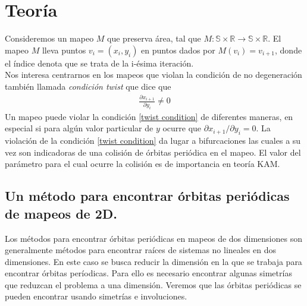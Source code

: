 
\chapter{Teor\'ia}
Consideremos un mapeo $M$ que preserva \'area, tal que $M:\mathbb{S} \times \mathbb{R} \longrightarrow \mathbb{S}\times\mathbb{R}$. El mapeo $M$ lleva puntos $v_{i}= (x_{i},y_{i})$ en puntos dados por $M(v_{i})=v_{i+1}$, donde el \'indice denota que se trata de la i-\'esima iteraci\'on. \\

Nos interesa centrarnos en los mapeos que violan la condici\'on de no degeneraci\'on tambi\'en llamada \textit{condici\'on twist} que dice que 
\begin{eqnarray}
\frac{\partial x_{i+1}}{\partial y_{i}} \neq 0
\label{twist condition}
\end{eqnarray}
Un mapeo puede violar la condici\'on \ref{twist condition} de diferentes maneras, en especial si para alg\'un valor particular de $y$ ocurre que $\partial x_{i+1}/\partial y_{i} = 0$. La violaci\'on de la condici\'on \ref{twist condition} da lugar a bifurcaciones las cuales a su vez son indicadoras de una colisi\'on de \'orbitas peri\'odica en el mapeo. El valor del par\'ametro para el cual ocurre la colisi\'on es de importancia en teor\'ia KAM. 

\section{Un m\'etodo para encontrar \'orbitas peri\'odicas de mapeos de 2D.}

Los m\'etodos para encontrar \'orbitas peri\'odicas en mapeos de dos dimensiones son generalmente m\'etodos para encontrar ra\'ices de sistemas no lineales en dos dimensiones. En este caso se busca reducir la dimensi\'on en la que se trabaja para encontrar \'orbitas per\'iodicas. Para ello es necesario encontrar algunas simetr\'ias que reduzcan el problema a una dimensi\'on. Veremos que las \'orbitas peri\'odicas se pueden encontrar usando simetr\'ias e involuciones.\\

